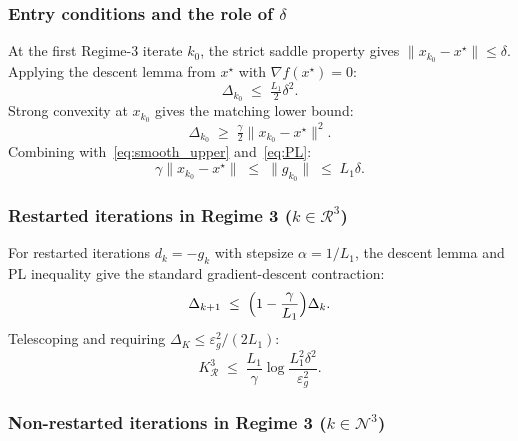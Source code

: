 \documentclass{article}
\begin{document}
\subsubsection{Entry conditions and the role of $\delta$}
\label{subsubsec:entry}

At the first Regime-3 iterate $k_0$, the strict saddle property
gives $\|x_{k_0}-x^\star\|\leq\delta$. Applying the descent lemma
from $x^\star$ with $\nabla f(x^\star)=0$:
\begin{equation}
\label{eq:entry_upper}
\Delta_{k_0} \;\leq\; \tfrac{L_1}{2}\delta^2.
\end{equation}
Strong convexity at $x_{k_0}$ gives the matching lower bound:
\begin{equation}
\label{eq:entry_lower}
\Delta_{k_0} \;\geq\; \tfrac{\gamma}{2}\|x_{k_0}-x^\star\|^2.
\end{equation}
Combining with~\eqref{eq:smooth_upper} and~\eqref{eq:PL}:
\begin{equation}
\label{eq:entry_grad}
\gamma\|x_{k_0}-x^\star\| \;\leq\; \|g_{k_0}\| \;\leq\; L_1\delta.
\end{equation}

\subsubsection{Restarted iterations in Regime 3
               ($k\in\mathcal{R}^3$)}

For restarted iterations $d_k=-g_k$ with stepsize $\alpha=1/L_1$,
the descent lemma and PL inequality give the standard gradient-descent
contraction:
\begin{equation}
\label{eq:R3_decrease}
\Delta_{k+1} \;\leq\; \Bigl(1-\frac{\gamma}{L_1}\Bigr)\Delta_k.
\end{equation}
Telescoping and requiring $\Delta_K\leq\varepsilon_g^2/(2L_1)$:
\begin{equation}
\label{eq:K_R3}
K^3_{\mathcal{R}} \;\leq\; \frac{L_1}{\gamma}
\log\frac{L_1^2\delta^2}{\varepsilon_g^2}.
\end{equation}

\subsubsection{Non-restarted iterations in Regime 3
               ($k\in\mathcal{N}^3$)}
\label{subsubsec:N3}
\end{document}
